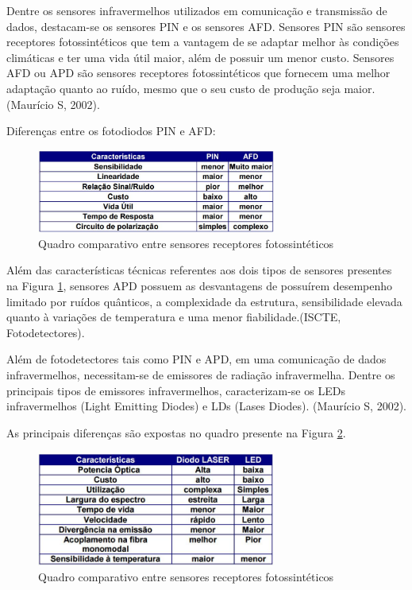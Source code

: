 Dentre os sensores infravermelhos utilizados em comunicação e transmissão de dados, destacam-se os sensores PIN e os sensores AFD. Sensores PIN são sensores receptores fotossintéticos que tem a vantagem de se adaptar melhor às condições climáticas e ter uma vida útil maior, além de possuir um menor custo. Sensores AFD ou APD são sensores receptores fotossintéticos que fornecem uma melhor adaptação quanto ao ruído, mesmo que o seu custo de produção seja maior. (Maurício S, 2002).

Diferenças entre os fotodiodos PIN e AFD:
\begin{figure}[!h]
	\centering
	\includegraphics[width=0.7\textwidth]{figuras/tabelaSensorFotossintetico.png}
	\caption{Quadro comparativo entre sensores receptores fotossintéticos}
	\label{fig:sensorfotossintetico}
\end{figure}

Além das características técnicas referentes aos dois tipos de sensores presentes na Figura \ref{fig:sensorfotossintetico}, sensores APD possuem as desvantagens de  possuírem desempenho limitado por ruídos quânticos, a complexidade da estrutura, sensibilidade elevada quanto à variações de temperatura e uma menor fiabilidade.(ISCTE, Fotodetectores).

Além de fotodetectores tais como PIN e APD, em uma comunicação de dados infravermelhos, necessitam-se de emissores de radiação infravermelha. Dentre os principais tipos de emissores infravermelhos, caracterizam-se os LEDs infravermelhos (Light Emitting Diodes) e LDs (Lases Diodes). (Maurício S, 2002).

As principais diferenças são expostas no quadro presente na Figura \ref{fig:sensorinfravermelho}.
\begin{figure}[!h]
	\centering
	\includegraphics[width=0.7\textwidth]{figuras/tabelaSensorInfravermelho.png}
	\caption{Quadro comparativo entre sensores receptores fotossintéticos}
	\label{fig:sensorinfravermelho}
\end{figure}

